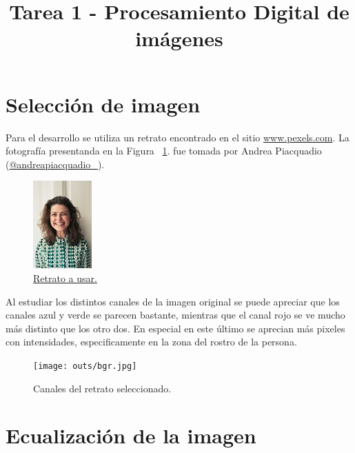 \documentclass[letterpaper,9pt,journal,final]{IEEEtran}
\title{Tarea 1 - Procesamiento Digital de imágenes}
\author{
            \IEEEauthorblockN{Pablo Yáñez S.}
        \IEEEauthorblockA{%
             - pablo.yanez@uai.cl}
        }
\date{}
\begin{document}
\maketitle


\hypertarget{selecciuxf3n-de-imagen}{%
\section{Selección de imagen}\label{selecciuxf3n-de-imagen}}

Para el desarrollo se utiliza un retrato encontrado en el sitio
\href{pexels.com}{www.pexels.com}. La fotografía presentanda en
la Figura ~\ref{fig:retrato}. fue tomada por Andrea Piacquadio
(\href{https://www.instagram.com/andreapiacquadio_/}{@andreapiacquadio\_}).

\begin{figure}[h!]
\hypertarget{fig:retrato}{%
\centering
\includegraphics[width=0.2\textwidth]{portrait.jpg}
\caption{\href{https://www.pexels.com/photo/women-s-white-and-black-button-up-collared-shirt-774909/}{Retrato
a usar.}}\label{fig:retrato}
}
\end{figure}

Al estudiar los distintos canales de la imagen original se puede
apreciar que los canales azul y verde se parecen bastante, mientras que
el canal rojo se ve mucho más distinto que los otro dos. En especial en
este último se aprecian más pixeles con intensidades, especificamente en
la zona del rostro de la persona.

\begin{figure}[h!]
\hypertarget{fig:canales_retrato}{%
\centering
\texttt{[image: outs/bgr.jpg]}
\caption{Canales del retrato seleccionado.}\label{fig:canales_retrato}
}
\end{figure}

\hypertarget{equalizaciuxf3n-de-la-imagen}{%
\section{Ecualización de la imagen}\label{equalizaciuxf3n-de-la-imagen}}
\end{document}
